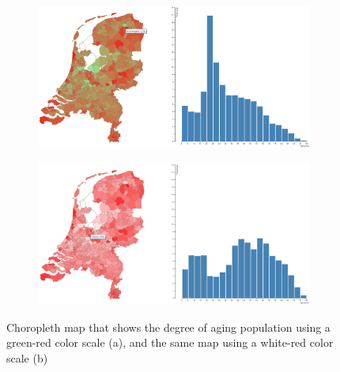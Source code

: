 \begin{figure}[h!]
    \centering
    \captionsetup{justification=centering,margin=0.5cm}
    \begin{subfigure}[t]{0.48\textwidth}
        \includegraphics[width=\textwidth]{img/agemapstudent.png}
        \caption{ }
    \end{subfigure}
    \begin{subfigure}[t]{0.48\textwidth}
        \includegraphics[width=\textwidth]{img/agemapcolor.png}
        \caption{ }
    \end{subfigure}
    \caption{Choropleth map that shows the degree of aging population using a green-red color scale (a), and the same map using a white-red color scale (b)}
    \label{fig:map}
\end{figure}
